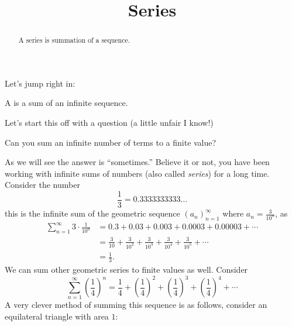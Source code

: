 \documentclass{ximera}
\title[Dig-In:]{Series}
\begin{document}
\begin{abstract}
A series is summation of a sequence.
\end{abstract}
\maketitle


Let's jump right in:


\begin{definition}
  A  is a sum of an infinite sequence.
\end{definition}


Let's start this off with a question (a little unfair I know!)

\begin{question}
  Can you sum an infinite number of terms to a finite value?
  \begin{prompt}
    \begin{multipleChoice}
    \end{multipleChoice}
  \end{prompt}
\end{question}
As we will see the answer is ``sometimes.''  Believe it or not, you
have been working with infinite sums of numbers (also called
\textit{series}) for a long time. Consider the number
\[
\frac{1}{3} = 0.3333333333\dots
\]
this is the infinite sum of the geometric sequence
$(a_n)_{n=1}^\infty$ where $a_n = \frac{3}{10^{n}}$, as
\begin{align*}
  \sum_{n=1}^\infty 3\cdot \frac{1}{10^{n}} &= 0.3 + 0.03+0.003+ 0.0003+ 0.00003+ \cdots\\
  &= \frac{3}{10} + \frac{3}{10^2} + \frac{3}{10^3} + \frac{3}{10^4} + \frac{3}{10^5} + \cdots\\
  &=\frac{1}{3}.
\end{align*}
We can sum other geometric series to finite values as well. Consider
\[
\sum_{n=1}^\infty \left(\frac{1}{4}\right)^n =
\frac{1}{4} + \left(\frac{1}{4}\right)^2 + \left(\frac{1}{4}\right)^3 + \left(\frac{1}{4}\right)^4 + \cdots 
\]
A very clever method of summing this sequence is as follows, consider
an equilateral triangle with area $1$:
\begin{image}
\end{image}
\end{document}
